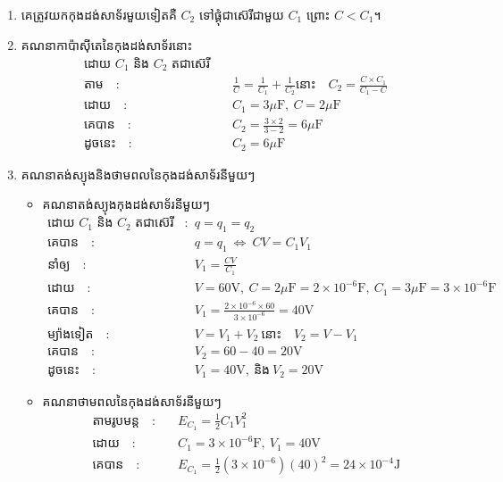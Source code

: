 \documentclass{classes/exam}
\begin{document}
\begin{enumerate}[I]
\begin{enumerate}[k]
		\item គេត្រូវយកកុងដង់សាទ័រមួយទៀតគឺ $C_{2}$ ទៅផ្គុំជាស៊េរីជាមួយ $C_{1}$ ព្រោះ $C<C_{1}$។
		\item គណនាកាប៉ាស៊ីតេនៃកុងដង់សាទ័រនោះ
		\begin{align*}
			\text{ដោយ $C_{1}$ និង $C_{2}$ តជាស៊េរី}\\
			\text{តាម}\quad :&\quad \frac{1}{C}=\frac{1}{C_{1}}+\frac{1}{C_{2}}
			\text{នោះ}\quad C_{2}=\frac{C\times C_{1}}{C_{1}-C}\\
			\text{ដោយ}\quad :&\quad C_{1}=3\mu\si{\farad},~C=2\mu\si{\farad}\\
			\text{គេបាន}\quad :&\quad C_{2}=\frac{3\times 2}{3-2}=6\mu\si{\farad}\\
			\text{ដូចនេះ}\quad :&\quad C_{2}=6\mu\si{\farad}
		\end{align*}
		\item គណនាតង់ស្យុងនិងថាមពលនៃកុងដង់សាទ័រនីមួយៗ
		\begin{itemize}
			\item គណនាតង់ស្យុងកុងដង់សាទ័រនីមួយៗ
			\begin{align*}
				\text{ដោយ $C_{1}$ និង $C_{2}$ តជាស៊េរី}\quad :&\quad q=q_{1}=q_{2}\\
				\text{គេបាន}\quad :&\quad q=q_{1}~\Leftrightarrow~ CV=C_{1}V_{1}\\
				\text{នាំឲ្យ}\quad :&\quad V_{1}=\frac{CV}{C_{1}}\\
				\text{ដោយ}\quad :&\quad V=60\si{\volt},~C=2\mu \si{\farad}=2\times 10^{-6}\si{\farad},~C_{1}=3\mu\si{\farad}=3\times 10^{-6}\si{\farad}\\
				\text{គេបាន}\quad :&\quad V_{1}=\frac{2\times 10^{-6}\times 60}{3\times 10^{-6}}=40\si{\volt}\\
				\text{ម្យ៉ាងទៀត}\quad :&\quad V=V_{1}+V_{2}~\text{នោះ}\quad V_{2}=V-V_{1}\\
				\text{គេបាន}\quad :&\quad V_{2}=60-40=20\si{\volt}\\
				\text{ដូចនេះ}\quad :&\quad V_{1}=40\si{\volt},~\text{និង}~V_{2}=20\si{\volt}
			\end{align*}
			\item គណនាថាមពលនៃកុងដង់សាទ័រនីមួយៗ
			\begin{align*}
				\text{តាមរូបមន្ត}\quad :&\quad E_{C_{1}}=\frac{1}{2}C_{1}V_{1}^{2}\\
				\text{ដោយ}\quad :&\quad C_{1}=3\times 10^{-6}\si{\farad},~V_{1}=40\si{\volt}\\
				\text{គេបាន}\quad :&\quad E_{C_{1}}=\frac{1}{2}\left(3\times10^{-6}\right)\left(40\right)^{2}=24\times 10^{-4}\si{\joule}\\

\end{align*}
\end{itemize}
\end{enumerate}
\end{enumerate}
\end{document}
